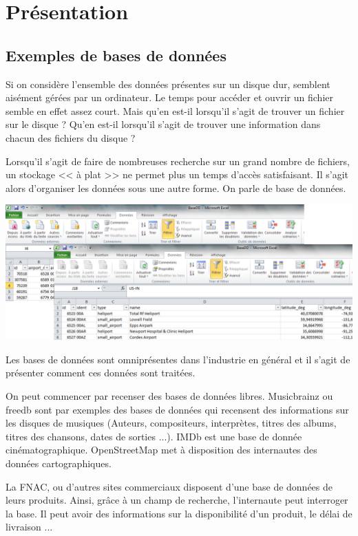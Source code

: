 \documentclass[10pt]{article}
\begin{document}
\section{Présentation}
\subsection{Exemples de bases de données}
Si on considère l'ensemble des données présentes sur un disque dur, semblent aisément gérées par un ordinateur. Le temps pour accéder et ouvrir un fichier semble en effet assez court. Mais qu'en est-il lorsqu'il s'agit de trouver un fichier sur le disque ? Qu'en est-il lorsqu'il s'agit de trouver une information dans chacun des fichiers du disque ?

\begin{minipage}[c]{.49\linewidth}
Lorsqu'il s'agit de faire de nombreuses recherche sur un grand nombre de fichiers, un stockage << à plat >> ne permet plus un temps d'accès satisfaisant. Il s'agit alors d'organiser les données sous une autre forme. On parle de base de données. 
\end{minipage} \hfill
\begin{minipage}[c]{.49\linewidth}
\includegraphics[width=.95\textwidth]{images/BDD_aplat}
\end{minipage}

Les bases de données sont omniprésentes dans l'industrie en général et il s'agit de présenter comment ces données sont traitées. 

On peut commencer par recenser des bases de données libres. Musicbrainz ou freedb sont par exemples des bases de données qui recensent des informations sur les disques de musiques (Auteurs, compositeurs, interprètes, titres des albums, titres des chansons, dates de sorties ...). IMDb est une base de donnée cinématographique. OpenStreetMap met à disposition des internautes des données cartographiques. 

La FNAC, ou d'autres sites commerciaux disposent d'une base de données de leurs produits. Ainsi, grâce à un champ de recherche, l'internaute peut interroger la base. Il peut avoir des informations sur la disponibilité d'un produit, le délai de livraison ...
\end{document}
